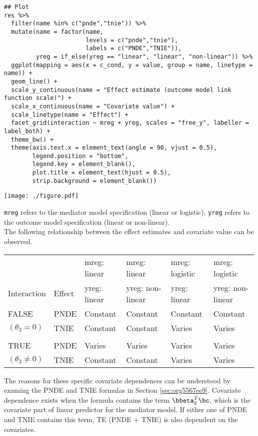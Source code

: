 \documentclass[10pt]{article}
\begin{document}
\begin{verbatim}
## Plot
res %>%
  filter(name %in% c("pnde","tnie")) %>%
  mutate(name = factor(name,
                       levels = c("pnde","tnie"),
                       labels = c("PNDE","TNIE")),
         yreg = if_else(yreg == "linear", "linear", "non-linear")) %>%
  ggplot(mapping = aes(x = c_cond, y = value, group = name, linetype = name)) +
  geom_line() +
  scale_y_continuous(name = "Effect estimate (outcome model link function scale)") +
  scale_x_continuous(name = "Covariate value") +
  scale_linetype(name = "Effect") +
  facet_grid(interaction ~ mreg + yreg, scales = "free_y", labeller = label_both) +
  theme_bw() +
  theme(axis.text.x = element_text(angle = 90, vjust = 0.5),
        legend.position = "bottom",
        legend.key = element_blank(),
        plot.title = element_text(hjust = 0.5),
        strip.background = element_blank())
\end{verbatim}

\begin{center}
\texttt{[image: ./figure.pdf]}
\end{center}

\normalsize

\texttt{mreg} refers to the mediator model specification (linear or logistic). \texttt{yreg} refers to the outcome model specification (linear or non-linear).\\

The following relationship between the effect estimates and covariate value can be observed.

\begin{center}
\begin{tabular}{llllll}
 &  & mreg: linear & mreg: linear & mreg: logistic & mreg: logistic\\
Interaction & Effect & yreg: linear & yreg: non-linear & yreg: linear & yreg: non-linear\\
\hline
FALSE & PNDE & Constant & Constant & Constant & Constant\\
\((\theta_{3} = 0)\) & TNIE & Constant & Constant & Varies & Varies\\
 &  &  &  &  & \\
TRUE & PNDE & Varies & Varies & Varies & Varies\\
\((\theta_{3} \ne 0)\) & TNIE & Constant & Constant & Varies & Varies\\
\end{tabular}
\end{center}

The reasons for these specific covariate dependences can be understood by examing the PNDE and TNIE formulas in Section \ref{sec:org5567ee9}. Covariate dependence exists when the formula contains the term \(\bbeta_{2}^{T}\bc\), which is the covariate part of linear predictor for the mediator model. If either one of PNDE and TNIE contains this term, TE (PNDE + TNIE) is also dependent on the covariates.\\
\end{document}
